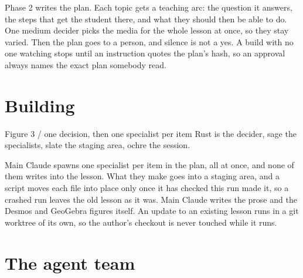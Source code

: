 \documentclass[11pt]{article}
\begin{document}
Phase 2 writes the plan. Each topic gets a teaching arc: the question it answers, the steps
that get the student there, and what they should then be able to do. One medium decider picks
the media for the whole lesson at once, so they stay varied. Then the plan goes to a person,
and silence is not a yes. A build with no one watching stops until an instruction quotes the
plan's hash, so an approval always names the exact plan somebody read.

\newpage

\section{Building}


\begin{hsfigure}{Figure 3 / one decision, then one specialist per item}%
{Rust is the decider, sage the specialists, slate the staging area, ochre the session.}
\end{hsfigure}

Main Claude spawns one specialist per item in the plan, all at once, and none of them writes
into the lesson. What they make goes into a staging area, and a script moves each file into
place only once it has checked this run made it, so a crashed run leaves the old lesson as it
was. Main Claude writes the prose and the Desmos and GeoGebra figures itself. An update to an
existing lesson runs in a git worktree of its own, so the author's checkout is never touched
while it runs.

\newpage

\section{The agent team}
\end{document}
